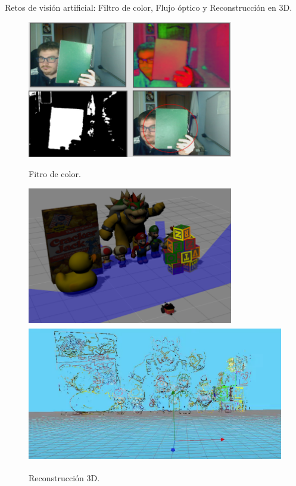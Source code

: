 \documentclass[a4paper, 12pt]{book}
\begin{document}
Retos de visión artificial: Filtro de color, Flujo óptico y Reconstrucción en 3D.
\begin{figure}[H]
  \centering
  \begin{minipage}[b]{0.4\textwidth}
    \includegraphics[width=\textwidth,height=60mm]{img/filtro_color}
    \caption{Fitro de color.}
  \end{minipage}
  \hfill
  \begin{minipage}[b]{0.4\textwidth}
  \includegraphics[width=\textwidth,height=60mm]{img/r3d2}
    \includegraphics[width=\textwidth,height=60mm]{img/r3d}
    \caption{Reconstrucción 3D.}
  \end{minipage}
\end{figure}
\end{document}
